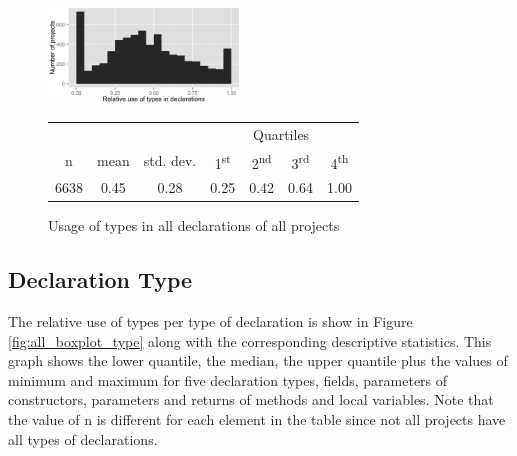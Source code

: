 \documentclass[preprint]{sigplanconf}
\newcommand{\ts}{\textsuperscript}
\begin{document}
\begin{figure}[h]
\centering 
\includegraphics[width=0.45\textwidth]{../analysis/result/all/histograms/5_all_types.png} 

\vspace{0.3cm}
\small
\begin{tabular}{|c|c|c|cccc|}
\hline
{}		&  {}		&  {}			&  \multicolumn{4}{c|}{Quartiles}				\\
n		& mean	& std. dev.	& 1\ts{st}	& 2\ts{nd}	& 3\ts{rd}	& 4\ts{th}		\\
\hline
\hline
6638 	& 0.45	& 0.28		& 0.25	& 0.42		& 0.64	& 1.00		\\
\hline
\end{tabular}


\caption{Usage of types in all declarations of all projects}
\label{fig:all_histogram_all} 
\end{figure}



\subsection{Declaration Type\label{sub:res_all_type}}
The relative use of types per type of declaration is show in Figure \ref{fig:all_boxplot_type} along with the corresponding descriptive statistics.
This graph shows the lower quantile, the median, the upper quantile plus the values of minimum and maximum for five declaration types, fields, parameters of constructors, parameters and returns of methods and local variables.
Note that the value of n is different for each element in the table since not all projects have all types of declarations. 
\end{document}
